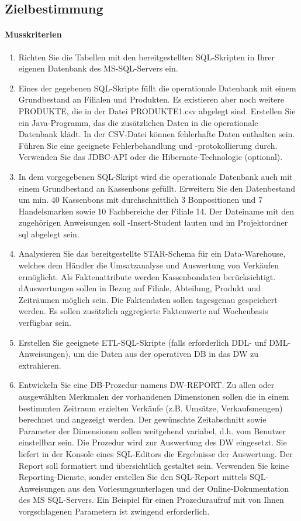 \subsection{Zielbestimmung}
\paragraph{Musskriterien}
\begin{enumerate}
  \item Richten Sie die Tabellen mit den bereitgestellten SQL-Skripten in Ihrer eigenen Datenbank
  des MS-SQL-Servers ein.
  \item Eines der gegebenen SQL-Skripte füllt die operationale Datenbank mit einem Grundbestand an Filialen und Produkten. Es existieren aber noch weitere PRODUKTE, die in der Datei \glqq PRODUKTE1.csv\grqq{} abgelegt sind. Erstellen Sie ein Java-Programm, das die zusätzlichen Daten in die operationale Datenbank klädt. In der CSV-Datei können fehlerhafte Daten enthalten sein. Führen Sie eine geeignete Fehlerbehandlung  und -protokollierung durch. Verwenden Sie das JDBC-API oder die Hibernate-Technologie (optional).
  \item In dem vorgegebenen SQL-Skript wird die operationale Datenbank auch mit einem Grundbestand an Kassenbons gefüllt. Erweitern Sie den Datenbestand um min. 40 Kassenbons mit durchschnittlich 3 Bonpositionen und 7 Handelsmarken sowie 10 Fachbereiche der Filiale 14. Der Dateiname mit den zugehörigen Anweisungen soll -Insert-Student\grq{} lauten und im Projektordner \glq sql\grq{} abgelegt sein.
  \item Analysieren Sie das bereitgestellte STAR-Schema für ein Data-Warehouse, welches dem Händler die Umsatzanalyse und Auswertung von Verkäufen ermöglicht. Als Faktenattribute werden Kassenbondaten berücksichtigt. dAuswertungen sollen in Bezug auf Filiale, Abteilung, Produkt und Zeiträumen möglich sein. Die Faktendaten sollen tagesgenau gespeichert werden. Es sollen zusätzlich aggregierte Faktenwerte auf Wochenbasis verfügbar sein.
  \item Erstellen Sie geeignete ETL-SQL-Skripte (falls erforderlich DDL- unf DML-Anweisungen), um die Daten aus der operativen DB in das DW zu extrahieren.
  \item Entwickeln Sie eine DB-Prozedur namens DW-REPORT. Zu allen oder ausgewählten Merkmalen der vorhandenen Dimensionen sollen die in einem bestimmten Zeitraum erzielten Verkäufe (z.B. Umsätze, Verkaufsmengen) berechnet und angezeigt werden. Der gewünschte Zeitabschnitt sowie Parameter der Dimensionen sollen weitgehend variabel, d.h. vom Benutzer einstellbar sein. Die Prozedur wird zur Auswertung des DW eingesetzt. Sie liefert in der Konsole eines SQL-Editors die Ergebnisse der Auswertung. Der Report soll formatiert und übersichtlich gestaltet sein. Verwenden Sie keine Reporting-Dienste, sonder erstellen Sie den SQL-Report mittels SQL-Anweisungen aus den Vorlesungsunterlagen und der Online-Dokumentation des MS SQL-Servers. Ein Beispiel für einen Prozeduraufruf mit von Ihnen vorgschlagenen Parametern ist zwingend erforderlich.
\end{enumerate}

